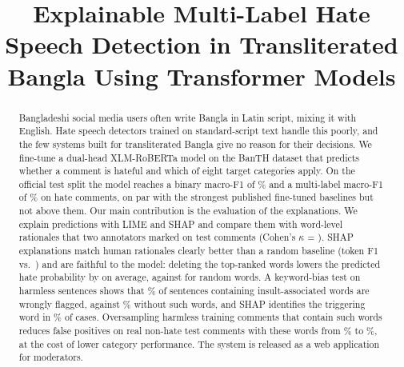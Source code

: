 \documentclass[conference,letterpaper,10pt]{IEEEtran}
\begin{document}
\title{Explainable Multi-Label Hate Speech Detection in Transliterated Bangla Using Transformer Models}

\author{
}

\maketitle

\begin{abstract}
Bangladeshi social media users often write Bangla in Latin script, mixing it with English. Hate speech detectors trained on standard-script text handle this poorly, and the few systems built for transliterated Bangla give no reason for their decisions. We fine-tune a dual-head XLM-RoBERTa model on the BanTH dataset that predicts whether a comment is hateful and which of eight target categories apply. On the official test split the model reaches a binary macro-F1 of \binF\% and a multi-label macro-F1 of \mlFhate\% on hate comments, on par with the strongest published fine-tuned baselines but not above them. Our main contribution is the evaluation of the explanations. We explain predictions with LIME and SHAP and compare them with word-level rationales that two annotators marked on \ratSample{} test comments (Cohen's $\kappa$ = \kappaVal). SHAP explanations match human rationales clearly better than a random baseline (token F1 \tokFShapA{} vs.\ \tokFRandomA) and are faithful to the model: deleting the top-ranked words lowers the predicted hate probability by \compShap{} on average, against \compRandom{} for random words. A keyword-bias test on harmless sentences shows that \biasFprA\% of sentences containing insult-associated words are wrongly flagged, against \biasFprB\% without such words, and SHAP identifies the triggering word in \biasShapTop\% of cases. Oversampling harmless training comments that contain such words reduces false positives on real non-hate test comments with these words from \debTestOldWith\% to \debTestNewWith\%, at the cost of lower category performance. The system is released as a web application for moderators.
\end{abstract}
\end{document}
